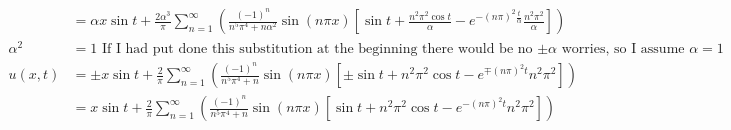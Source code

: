 \documentclass{article}
\begin{document}
\begin{align*}
  &=\alpha x\sin t+\frac{2\alpha^3}{\pi}\sum\limits_{n=1}^\infty{\left(\frac{(-1)^n}{n^5\pi^4+n\alpha^2} \sin(n\pi x)\left[\sin t+\frac{n^2\pi^2\cos t}{\alpha}-e^{-(n\pi)^2\frac{t}{\alpha}}\frac{n^2\pi^2}{\alpha}\right]\right)}\\
  \alpha^2&=1\text{ If I had put done this substitution at the beginning there would be no $\pm\alpha$ worries, so I assume $\alpha=1$}\\
  u(x,t)&=\pm x\sin t+\frac{2}{\pi}\sum\limits_{n=1}^\infty{\left(\frac{(-1)^n}{n^5\pi^4+n} \sin(n\pi x)\left[\pm\sin t+n^2\pi^2\cos t-e^{\mp(n\pi)^2t}n^2\pi^2\right]\right)}\\
  &=x\sin t+\frac{2}{\pi}\sum\limits_{n=1}^\infty{\left(\frac{(-1)^n}{n^5\pi^4+n} \sin(n\pi x)\left[\sin t+n^2\pi^2\cos t-e^{-(n\pi)^2t}n^2\pi^2\right]\right)}\\
\end{align*}
\end{document}
